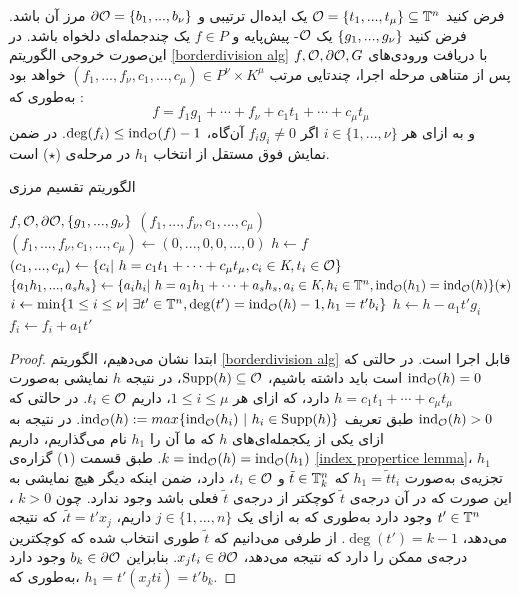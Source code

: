 \begin{proposition}
فرض کنید 
${\mathcal O} = \{t_{1},...,t_{\mu}\}\subseteq{\mathbb{T}}^{n}$
یک ایده‌ال ترتیبی 
و 
$\partial\mathcal{O} = \{b_{1},...,b_{\nu}\}$
مرز آن باشد. فرض کنید 
$\{g_{1},...,g_{\nu}\}$
یک 
${\mathcal O}$-
پیش‌پایه و 
$f\in P$
یک چندجمله‌ای دلخواه باشد. در این‌صورت خروجی  الگوریتم 
\ref{borderdivision alg}
با دریافت ورودی‌های 
$f, {\mathcal O}, \partial\mathcal{O}, G$
پس از متناهی مرحله اجرا، چندتایی مرتب 
$(f_{1},...,f_{\nu},c_{1},...,c_{\mu})\in P^{\nu}\times K^{\mu}$
خواهد بود به‌طوری که :
$$f = f_{1}g_{1} + \cdots + f_{\nu} + c_{1}t_{1} + \cdots + c_{\mu}t_{\mu}$$
و به ازای هر 
$i\in\{1,...,\nu\}$
اگر 
$f_{i}g_{i}\neq 0$
آن‌گاه، 
$\deg(f_{i})\leq \operatorname{\mathrm{ind}}_{{\mathcal O}}(f) - 1$.
در ضمن نمایش فوق مستقل از انتخاب 
$h_{1}$
در مرحله‌ی 
($\star$)
است.
\begin{algorithm}[]
	\caption{الگوریتم تقسیم مرزی}
	\label{borderdivision alg}	
	\begin{latin}
		\begin{algorithmic}[]
			\REQUIRE  $f, {\mathcal O}, \partial\mathcal{O}, \{g_{1},...,g_{\nu}\}$
			\ENSURE  $(f_{1},...,f_{\nu},c_{1},...,c_{\mu})$ 
			\STATE $(f_{1},...,f_{\nu},c_{1},...,c_{\mu})\leftarrow (0,...,0,0,...,0)$ 
			\STATE $h\gets f$
			\STATE $(c_{1},...,c_{\mu})\gets\{c_{i}| \ h = c_{1}t_{1} + \cdots + c_{\mu}t_{\mu}, c_{i}\in \textit{K}, t_{i}\in{\mathcal O}\}$
			\PRINT{}		
			\STATE $\{a_{1}h_{1},...,a_{s}h_{s}\}\gets \{a_{i}h_{i}| \ h = a_{1}h_{1} + \cdots + a_{s}h_{s}, a_{i}\in \fld, h_{i}\in\tn, \ind_{\mO}(h_{1}) = \ind_{\mO}(h)\}(\star)$
			\STATE $i\gets \min\{1\leq i\leq \nu | \ \exists t'\in {\mathbb{T}}^{n}, \deg(t') = \operatorname{\mathrm{ind}}_{{\mathcal O}}(h) - 1, h_{1} = t'b_{i}\}$
			\STATE $h\gets h - a_{1}t'g_{i}$
			\STATE $f_{i}\gets f_{i} + a_{1}t'$
			\ENDIF			
			\ENDWHILE
		\end{algorithmic}
	\end{latin}
\end{algorithm}
\begin{proof}
ابتدا نشان می‌دهیم، الگوریتم 
\ref{borderdivision alg}
قابل اجرا است. در حالتی که 
$\operatorname{\mathrm{ind}}_{{\mathcal O}}(h) = 0$
است باید داشته باشیم، 
$\operatorname{\mathrm{Supp}}(h)\subseteq {\mathcal O}$،
در نتیجه 
$h$
نمایشی به‌صورت 
$h = c_{1}t_{1} + \cdots + c_{\mu}t_{\mu}$
دارد، که ازای هر 
$1\leq i\leq \mu$،
داریم
$t_{i}\in{\mathcal O}$.
در حالتی که 
$\operatorname{\mathrm{ind}}_{{\mathcal O}}(h)>0$
طبق تعریف 
$\ind_{\mO}(h):=max\{\ind_{\mO}(h_{i}) \ | \ h_{i}\in \Supp(h)\}$.
در نتیجه به ازای یکی از یکجمله‌ای‌های 
$h$
که ما آن را 
$h_{1}$
نام می‌گذاریم، داریم 
$k = \operatorname{\mathrm{ind}}_{{\mathcal O}}(h) = \operatorname{\mathrm{ind}}_{{\mathcal O}}(h_{1})$.
طبق قسمت (۱) گزاره‌ی 
\ref{index propertice lemma}،
$h_{1}$
تجزیه‌ی به‌صورت 
$h_{1} = \tilde{t}t_{i}$
که 
$\tilde{t}\in{\mathbb{T}}^{n}_{k}$
و
$t_{i}\in{\mathcal O}$،
دارد، ضمن اینکه دیگر هیچ نمایشی به این صورت که در آن درجه‌ی 
$\tilde{t}$
کوچکتر از درجه‌ی 
$\tilde{t}$
فعلی باشد وجود ندارد. چون 
$k >‌0$
، 
$t'\in{\mathbb{T}}^{n}$
وجود دارد به‌طوری که به ازای یک 
$j\in\{1,...,n\}$
داریم، 
$\tilde{t} = t'x_{j}$،
که نتیجه می‌دهد،
$\deg(t') = k - 1$.
از طرفی می‌دانیم که 
$\tilde{t}$
طوری انتخاب شده که کوچکترین درجه‌ی ممکن را دارد که نتیجه می‌دهد، 
$x_{j}t_{i}\in\partial\mathcal{O}$.
بنابراین 
$b_{k}\in\partial\mathcal{O}$
وجود دارد به‌طوری که، 
$h_{1} = t'(x_{j}t{i}) = t'b_{k}$.


\end{proof}
\end{proposition}
